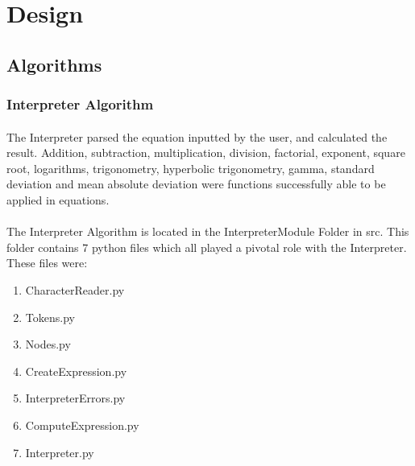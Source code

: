 \section{Design}
    \subsection{Algorithms}

    \subsubsection{Interpreter Algorithm}
        \paragraph{}
        The Interpreter parsed the equation inputted by the user, and calculated the result. Addition, subtraction, multiplication, division, factorial, exponent, square root,  logarithms, trigonometry, hyperbolic trigonometry, gamma, standard deviation and mean absolute deviation were functions successfully able to be applied in equations.

        \paragraph{}
        The Interpreter Algorithm is located in the InterpreterModule Folder in src. This folder contains 7 python files which all played a pivotal role with the Interpreter. These files were:

        \begin{enumerate}
            \item CharacterReader.py
            \item Tokens.py
            \item Nodes.py
            \item CreateExpression.py
            \item InterpreterErrors.py
            \item ComputeExpression.py
            \item Interpreter.py
        \end{enumerate}

